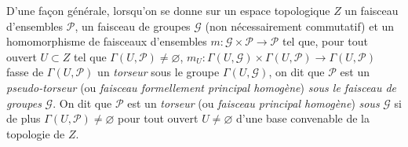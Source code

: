 \begin{env}[16.5.15]
D'une façon générale, lorsqu'on se donne sur un espace topologique $Z$ un
faisceau d'ensembles $\mathscr{P}$, un faisceau de groupes $\mathscr{G}$ (non
nécessairement commutatif) et un homomorphisme de faisceaux d'ensembles
$m:\mathscr{G}\times\mathscr{P}\to\mathscr{P}$ tel que, pour tout ouvert
$U\subset Z$ tel que $\Gamma(U,\mathscr{P})\neq\varnothing$,
$m_U:\Gamma(U,\mathscr{G})\times\Gamma(U,\mathscr{P})\to\Gamma(U,\mathscr{P})$
fasse de $\Gamma(U,\mathscr{P})$ un \emph{torseur} sous le groupe
$\Gamma(U,\mathscr{G})$, on dit que $\mathscr{P}$ est un
\emph{pseudo-torseur} (ou \emph{faisceau formellement principal homogène})
\emph{sous le faisceau de groupes} $\mathscr{G}$. On dit que $\mathscr{P}$ est un
\emph{torseur} (ou \emph{faisceau principal homogène}) \emph{sous} $\mathscr{G}$ si
de plus $\Gamma(U,\mathscr{P})\neq\varnothing$ pour tout ouvert
$U\neq\varnothing$ d'une base convenable de la topologie de $Z$.


\end{env}
